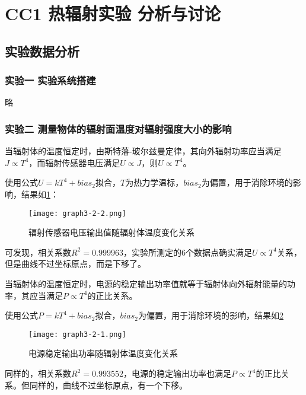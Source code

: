\documentclass[dvipsnames, svgnames,a4paper,11pt]{article}
\begin{document}
\section{CC1 \quad 热辐射实验 \quad\heiti 分析与讨论}

\subsection{实验数据分析}

	\subsubsection{实验一 \quad 实验系统搭建}

	略



	\subsubsection{实验二 \quad 测量物体的辐射面温度对辐射强度大小的影响}


	当辐射体的温度恒定时，由斯特藩-玻尔兹曼定律，其向外辐射功率应当满足$J\propto T^4$，而辐射传感器电压满足$U\propto J$，则$U\propto T^4$。

	使用公式$U=kT^4+bias_2$拟合，$T$为热力学温标，$bias_2$为偏置，用于消除环境的影响，结果如\cref{fig:graph3-2-2}：
	\begin{figure}[htbp]
		\centering
		\texttt{[image: graph3-2-2.png]}
		\caption{辐射传感器电压输出值随辐射体温度变化关系}
		\label{fig:graph3-2-2}
	\end{figure}

	可发现，相关系数$R^2=0.999963$，实验所测定的6个数据点确实满足$U\propto T^4$关系，但是曲线不过坐标原点，而是下移了。




	当辐射体的温度恒定时，电源的稳定输出功率值就等于辐射体向外辐射能量的功率，其应当满足$P\propto T^4$的正比关系。

	使用公式$P=kT^4+bias_2$拟合，$bias_2$为偏置，用于消除环境的影响，结果如\cref{fig:graph3-2-1}
	\begin{figure}[htbp]
		\centering
		\texttt{[image: graph3-2-1.png]}
		\caption{电源稳定输出功率随辐射体温度变化关系}
		\label{fig:graph3-2-1}
	\end{figure}

	同样的，相关系数$R^2=0.993552$，电源的稳定输出功率也满足$P\propto T^4$的正比关系。但同样的，曲线不过坐标原点，有一个下移。\\
\end{document}
